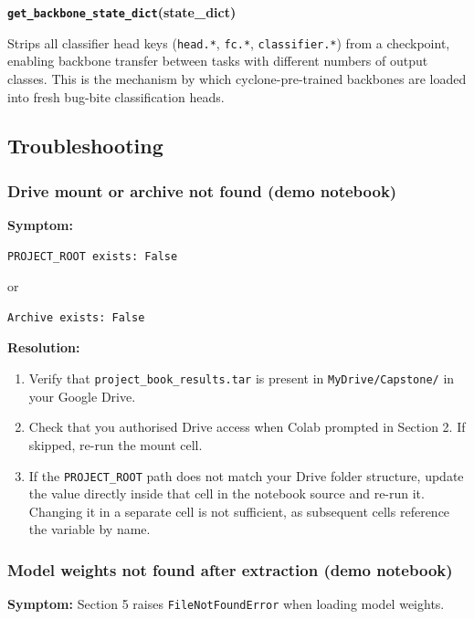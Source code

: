 \documentclass[12pt,a4paper]{article}
\begin{document}
\textbf{\texttt{get\_backbone\_state\_dict}(state\_dict)}

Strips all classifier head keys (\texttt{head.*}, \texttt{fc.*},
\texttt{classifier.*}) from a checkpoint, enabling backbone transfer
between tasks with different numbers of output classes. This is the
mechanism by which cyclone-pre-trained backbones are loaded into fresh
bug-bite classification heads.

\subsection{Troubleshooting}
\label{sec:ug-troubleshoot}

\subsubsection{Drive mount or archive not found (demo notebook)}

\textbf{Symptom:}
\begin{lstlisting}
PROJECT_ROOT exists: False
\end{lstlisting}
or
\begin{lstlisting}
Archive exists: False
\end{lstlisting}

\textbf{Resolution:}
\begin{enumerate}
    \item Verify that \texttt{project\_book\_results.tar} is present in
          \texttt{MyDrive/Capstone/} in your Google Drive.
    \item Check that you authorised Drive access when Colab prompted in
          Section 2. If skipped, re-run the mount cell.
    \item If the \texttt{PROJECT\_ROOT} path does not match your Drive
          folder structure, update the value directly inside that cell in
          the notebook source and re-run it. Changing it in a separate
          cell is not sufficient, as subsequent cells reference the
          variable by name.
\end{enumerate}

\subsubsection{Model weights not found after extraction (demo notebook)}

\textbf{Symptom:} Section 5 raises \texttt{FileNotFoundError} when loading
model weights.
\end{document}
